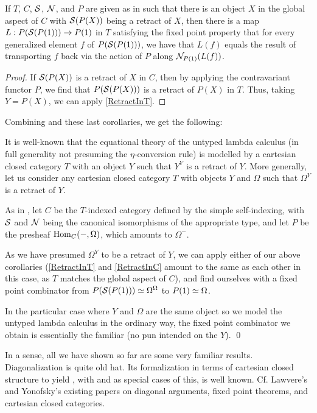 \begin{corollary}\label{RetractInC}
If $T$, $C$, $\mathcal{S}$, $\mathcal{N}$, and $P$ are given as in  such that there is an object $X$ in the global aspect of $C$ with $\mathcal{S}(P(X))$ being a retract of $X$, then there is a map $L : P(\mathcal{S}(P(1))) \to P(1)$ in $T$ satisfying the fixed point property that for every generalized element $f$ of $P(\mathcal{S}(P(1)))$, we have that $L(f)$ equals the result of transporting $f$ back via the action of $P$ along $\mathcal{N}_{P(1)}(L(f))$.
\end{corollary}
\begin{proof}
If $\mathcal{S}(P(X))$ is a retract of $X$ in $C$, then by applying the contravariant functor $P$, we find that $P(\mathcal{S}(P(X)))$ is a retract of $P(X)$ in $T$. Thus, taking $Y = P(X)$, we can apply \cref{RetractInT}.
\end{proof}

Combining  and these last corollaries, we get the following:

\label{YCombinator}
It is well-known that the equational theory of the untyped lambda calculus (in full generality not presuming the $\eta$-conversion rule) is modelled by a cartesian closed category $T$ with an object $Y$ such that $Y^Y$ is a retract of $Y$. More generally, let us consider any cartesian closed category $T$ with objects $Y$ and $\Omega$ such that $\Omega^Y$ is a retract of $Y$.

As in , let $C$ be the $T$-indexed category defined by the simple self-indexing, with $\mathcal{S}$ and $\mathcal{N}$ being the canonical isomorphisms of the appropriate type, and let $P$ be the presheaf $\operatorname{Hom}_C(-, \Omega)$, which amounts to $\Omega^{-}$.

As we have presumed $\Omega^Y$ to be a retract of $Y$, we can apply either of our above corollaries (\cref{RetractInT} and \cref{RetractInC} amount to the same as each other in this case, as $T$ matches the global aspect of $C$), and find ourselves with a fixed point combinator from $P(\mathcal{S}(P(1))) \simeq \Omega^{\Omega}$ to $P(1) \simeq \Omega$. 

In the particular case where $Y$ and $\Omega$ are the same object so we model the untyped lambda calculus in the ordinary way, the fixed point combinator we obtain is essentially the familiar  (no pun intended on the $Y$). \qed
{}

In a sense, all we have shown so far are some very familiar results. Diagonalization is quite old hat. Its formalization in terms of cartesian closed structure to yield , with  and  as special cases of this, is well known. Cf. Lawvere's and Yonofsky's existing papers on diagonal arguments, fixed point theorems, and cartesian closed categories. 

